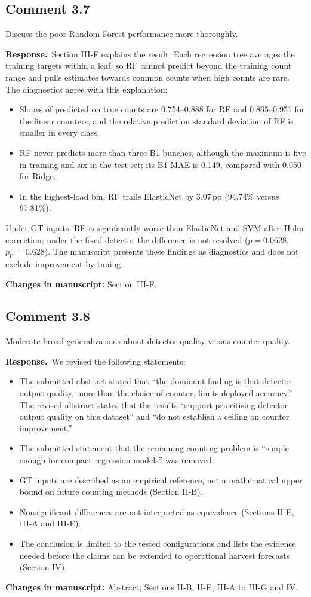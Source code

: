 \documentclass[10pt,a4paper]{article}
\newcommand{\resp}{\textbf{Response.}\ }
\newcommand{\changes}[1]{\par\textbf{Changes in manuscript:} #1}
\newcommand{\pH}{p_{\mathrm{H}}}
\newcommand{\pp}{\,pp}
\begin{document}
\subsection{Comment 3.7}
\begin{cmt}
Discuss the poor Random Forest performance more thoroughly.
\end{cmt}
\resp Section III-F explains the result. Each regression tree averages the training
targets within a leaf, so RF cannot predict beyond the training count range and pulls
estimates towards common counts when high counts are rare. The diagnostics agree with
this explanation:
\begin{itemize}
\item Slopes of predicted on true counts are 0.754--0.888 for RF and 0.865--0.951 for
  the linear counters, and the relative prediction standard deviation of RF is smaller
  in every class.
\item RF never predicts more than three B1 bunches, although the maximum is five in
  training and six in the test set; its B1 MAE is 0.149, compared with 0.050 for Ridge.
\item In the highest-load bin, RF trails ElasticNet by 3.07\pp{} (94.74\% versus 97.81\%).
\end{itemize}
Under GT inputs, RF is significantly worse than ElasticNet and SVM after Holm correction;
under the fixed detector the difference is not resolved ($p=0.0628$, $\pH=0.628$). The
manuscript presents these findings as diagnostics and does not exclude improvement by
tuning.
\changes{Section III-F.}

\subsection{Comment 3.8}
\begin{cmt}
Moderate broad generalizations about detector quality versus counter quality.
\end{cmt}
\resp We revised the following statements:
\begin{itemize}
\item The submitted abstract stated that ``the dominant finding is that detector output
  quality, more than the choice of counter, limits deployed accuracy.'' The revised
  abstract states that the results ``support prioritising detector output quality on
  this dataset'' and ``do not establish a ceiling on counter improvement.''
\item The submitted statement that the remaining counting problem is ``simple enough for
  compact regression models'' was removed.
\item GT inputs are described as an empirical reference, not a mathematical upper bound
  on future counting methods (Section II-B).
\item Nonsignificant differences are not interpreted as equivalence (Sections II-E, III-A
  and III-E).
\item The conclusion is limited to the tested configurations and lists the evidence
  needed before the claims can be extended to operational harvest forecasts
  (Section IV).
\end{itemize}
\changes{Abstract; Sections II-B, II-E, III-A to III-G and IV.}
\end{document}
